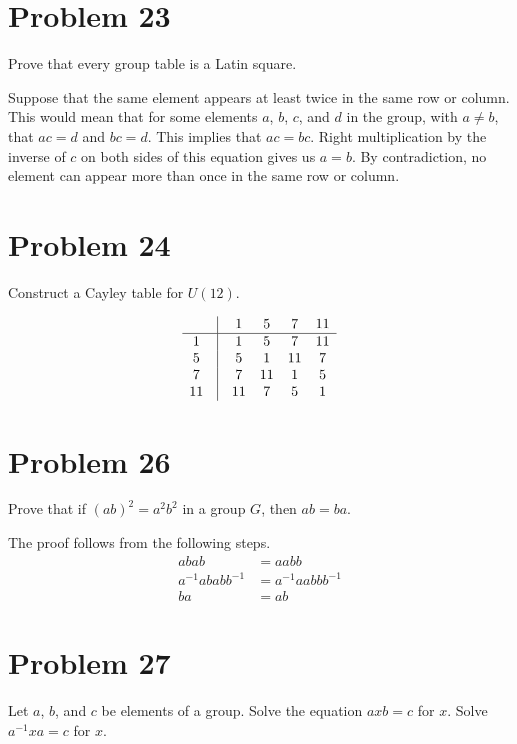 \documentclass{article}
\begin{document}
\section*{Problem 23}

Prove that every group table is a Latin square.

Suppose that the same element appears at least twice in the same row or column.
This would mean that
for some elements $a$, $b$, $c$, and $d$ in the group, with $a\neq b$, that $ac=d$ and $bc=d$.
This implies that $ac=bc$.  Right multiplication by the inverse of $c$ on both sides
of this equation gives us $a=b$.  By contradiction, no element can appear more than
once in the same row or column.

\section*{Problem 24}

Construct a Cayley table for $U(12)$.

\begin{equation*}
\begin{array}{cccccc}
   &\vline &  1 &  5 &  7 & 11 \\
\hline
1  &\vline &  1 &  5 &  7 & 11 \\
5  &\vline &  5 &  1 & 11 &  7 \\
7  &\vline &  7 & 11 &  1 &  5 \\
11 &\vline & 11 &  7 &  5 &  1
\end{array}
\end{equation*}

\section*{Problem 26}

Prove that if $(ab)^2=a^2b^2$ in a group $G$, then $ab=ba$.

The proof follows from the following steps.
\begin{align*}
abab &= aabb \\
a^{-1}ababb^{-1} &= a^{-1}aabbb^{-1} \\
ba &= ab
\end{align*}

\section*{Problem 27}

Let $a$, $b$, and $c$ be elements of a group.  Solve the equation $axb=c$ for $x$.
Solve $a^{-1}xa=c$ for $x$.
\end{document}
